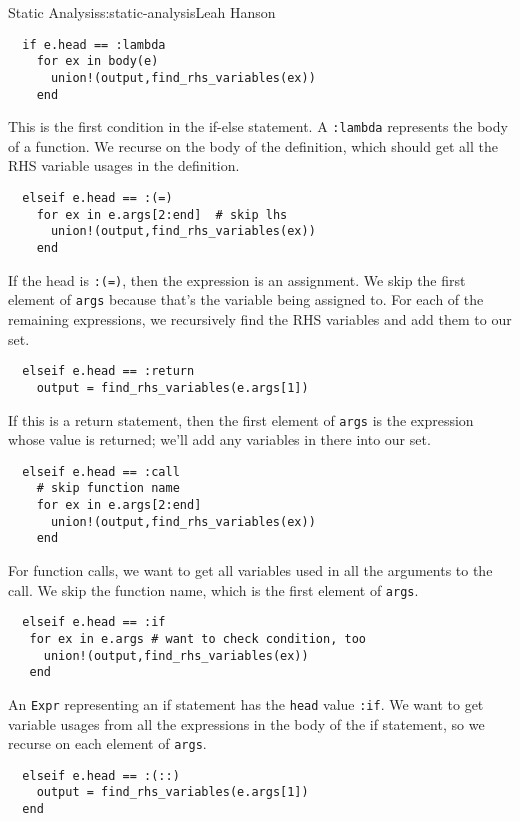 \begin{aosachapter}{Static Analysis}{s:static-analysis}{Leah Hanson}
\begin{verbatim}
  if e.head == :lambda
    for ex in body(e)
      union!(output,find_rhs_variables(ex))
    end
\end{verbatim}

This is the first condition in the if-else statement. A \texttt{:lambda}
represents the body of a function. We recurse on the body of the
definition, which should get all the RHS variable usages in the
definition.

\begin{verbatim}
  elseif e.head == :(=)
    for ex in e.args[2:end]  # skip lhs
      union!(output,find_rhs_variables(ex))
    end
\end{verbatim}

If the head is \texttt{:(=)}, then the expression is an assignment. We
skip the first element of \texttt{args} because that's the variable
being assigned to. For each of the remaining expressions, we recursively
find the RHS variables and add them to our set.

\begin{verbatim}
  elseif e.head == :return
    output = find_rhs_variables(e.args[1])
\end{verbatim}

If this is a return statement, then the first element of \texttt{args}
is the expression whose value is returned; we'll add any variables in
there into our set.

\begin{verbatim}
  elseif e.head == :call
    # skip function name
    for ex in e.args[2:end]
      union!(output,find_rhs_variables(ex))
    end
\end{verbatim}

For function calls, we want to get all variables used in all the
arguments to the call. We skip the function name, which is the first
element of \texttt{args}.

\begin{verbatim}
  elseif e.head == :if
   for ex in e.args # want to check condition, too
     union!(output,find_rhs_variables(ex))
   end
\end{verbatim}

An \texttt{Expr} representing an if statement has the \texttt{head}
value \texttt{:if}. We want to get variable usages from all the
expressions in the body of the if statement, so we recurse on each
element of \texttt{args}.

\begin{verbatim}
  elseif e.head == :(::)
    output = find_rhs_variables(e.args[1])
  end
\end{verbatim}


\end{aosachapter}
